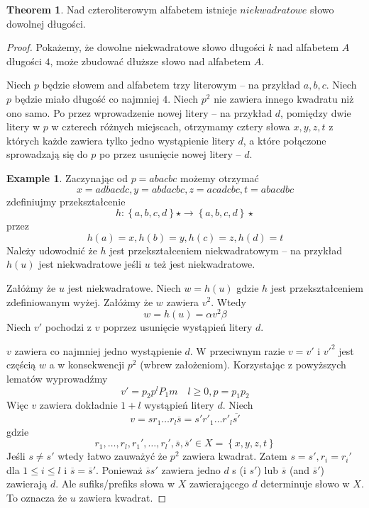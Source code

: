 \documentclass[11pt,a4paper]{article}
\theoremstyle{definition}
\newtheorem{theorem}{Theorem}[section]
\newtheorem{example}{Example}[section]
\begin{document}
\begin{theorem}
Nad czteroliterowym alfabetem istnieje $niekwadratowe$
słowo dowolnej długości.
\begin{proof}
Pokażemy, że dowolne niekwadratowe słowo długości $k$ nad alfabetem $A$
długości $4$, może zbudować dłuższe słowo nad alfabetem $A$.

Niech $p$ będzie słowem and alfabetem trzy literowym -- na przykład $a,b,c$.
Niech $p$ będzie miało długość co najmniej $4$.
Niech $p^2$ nie zawiera innego kwadratu niż ono samo.
Po przez wprowadzenie nowej litery -- na przykład $d$, pomiędzy
dwie litery w $p$ w czterech różnych miejscach, otrzymamy cztery
słowa $x,y,z,t$ z których każde zawiera tylko jedno wystąpienie litery $d$,
a które połączone sprowadzają się do $p$ po przez usunięcie nowej litery -- $d$.

\begin{example}
Zaczynając od $p = abacbc$ możemy otrzymać
$$
x = adbacdc, y = abdacbc, z = acadcbc, t = abacdbc
$$
zdefiniujmy przekształcenie
$$
h: \left\lbrace a,b,c,d\right\rbrace\star \rightarrow \left\lbrace a,b,c,d\right\rbrace\star
$$
przez
$$
h(a) = x, h(b) = y, h(c) = z, h(d) = t
$$
Należy udowodnić że $h$ jest przekształceniem niekwadratowym -- na przykład
$h(u)$ jest niekwadratowe jeśli $u$ też jest niekwadratowe.
\end{example}
Załóżmy że $u$ jest niekwadratowe. Niech $w=h(u)$ gdzie $h$ jest przekształceniem
zdefiniowanym wyżej. Załóżmy że $w$ zawiera $v^2$. Wtedy
$$
w = h(u) = \alpha v^2\beta
$$
Niech $v'$ pochodzi z $v$ poprzez usunięcie wystąpień litery $d$.

$v$ zawiera co najmniej jedno wystąpienie $d$. W przeciwnym razie $v = v'$ i
$v'^2$ jest częścią $w$ a w konsekwencji $p^2$ (wbrew założeniom). Korzystając z
powyższych lematów wyprowadźmy
$$
v' = p_2 p^l P_1 m \quad l \geq 0, p = p_1 p_2
$$
Więc $v$ zawiera dokładnie $1+l$ wystąpień litery $d$. Niech
$$
v = sr_1\dots r_l\overline{s} = s'r'_1\dots r'_l\overline{s'}
$$
gdzie
$$
r_1,\ldots,r_l,r_1',\ldots,r_l',\overline{s},\overline{s}'
\in X = \left\lbrace x,y,z,t \right\rbrace
$$
Jeśli $s \neq s'$ wtedy łatwo zauważyć że $p^2$ zawiera kwadrat.
Zatem $s=s', r_i=r_i'$ dla
$1 \leq i \leq l$
i
$\overline{s} = \overline{s}'$. Ponieważ $\overline{s}s'$ zawiera
jedno $d$ s (i $s'$) lub $\overline{s}$ (and $\overline{s}'$)
zawierają $d$. Ale sufiks/prefiks słowa w $X$ zawierającego $d$
determinuje słowo w $X$. To oznacza że $u$ zawiera kwadrat.
\end{proof}
\end{theorem}
\end{document}
